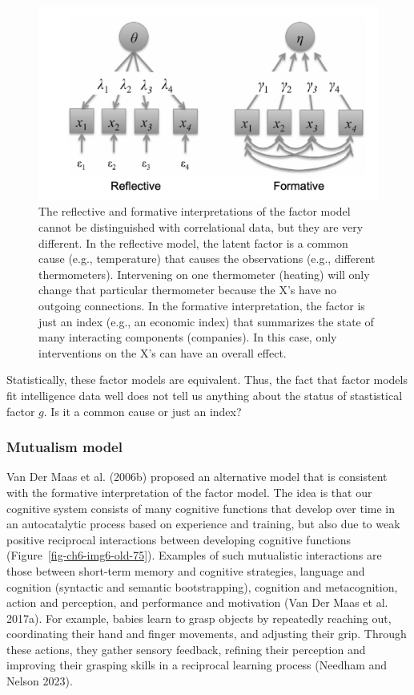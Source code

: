 \documentclass[
  a4paper,
  DIV=11,
  numbers=noendperiod,
  oneside]{scrreprt}
\begin{document}
\begin{figure}

{\centering \includegraphics{media/ch6/image5.jpg}

}

\caption{\label{fig-ch6-img5-old-74}The reflective and formative
interpretations of the factor model cannot be distinguished with
correlational data, but they are very different. In the reflective
model, the latent factor is a common cause (e.g., temperature) that
causes the observations (e.g., different thermometers). Intervening on
one thermometer (heating) will only change that particular thermometer
because the X's have no outgoing connections. In the formative
interpretation, the factor is just an index (e.g., an economic index)
that summarizes the state of many interacting components (companies). In
this case, only interventions on the X's can have an overall effect.}

\end{figure}

Statistically, these factor models are equivalent. Thus, the fact that
factor models fit intelligence data well does not tell us anything about
the status of stastistical factor \(g\). Is it a common cause or just an
index?

\hypertarget{sec-Mutualism-model}{%
\subsubsection{Mutualism model}\label{sec-Mutualism-model}}

Van Der Maas et al. (2006b) proposed an alternative model that is
consistent with the formative interpretation of the factor model. The
idea is that our cognitive system consists of many cognitive functions
that develop over time in an autocatalytic process based on experience
and training, but also due to weak positive reciprocal interactions
between developing cognitive functions
(Figure~\ref{fig-ch6-img6-old-75}). Examples of such mutualistic
interactions are those between short-term memory and cognitive
strategies, language and cognition (syntactic and semantic
bootstrapping), cognition and metacognition, action and perception, and
performance and motivation (Van Der Maas et al. 2017a). For example,
babies learn to grasp objects by repeatedly reaching out, coordinating
their hand and finger movements, and adjusting their grip. Through these
actions, they gather sensory feedback, refining their perception and
improving their grasping skills in a reciprocal learning process
(Needham and Nelson 2023).
\end{document}
